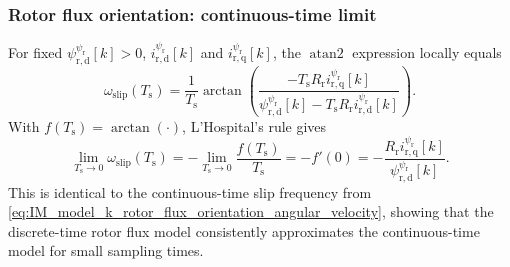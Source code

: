 \begin{frame}
    \frametitle{Rotor flux orientation: continuous-time limit}
    For fixed \(\psi^{\psi_\mathrm{r}}_{\mathrm{r,d}}[k]>0\), \(i^{\psi_\mathrm{r}}_{\mathrm{r,d}}[k]\) and \(i^{\psi_\mathrm{r}}_{\mathrm{r,q}}[k]\), the \(\operatorname{atan2}\) expression locally equals
    \begin{equation}
        \omega_\mathrm{slip}(T_\mathrm{s})=\frac{1}{T_\mathrm{s}}
        \arctan\!\left(
        \frac{-T_\mathrm{s}R_\mathrm{r}i^{\psi_\mathrm{r}}_{\mathrm{r,q}}[k]}
        {\psi^{\psi_\mathrm{r}}_{\mathrm{r,d}}[k]-T_\mathrm{s}R_\mathrm{r}i^{\psi_\mathrm{r}}_{\mathrm{r,d}}[k]}
        \right).
        \label{eq:IM_dt_RFO_slip_limit_start}
    \end{equation}\pause%
    With \(f(T_\mathrm{s})=\arctan(\cdot)\), L'Hospital's rule gives
    \begin{equation}
        \lim_{T_\mathrm{s}\rightarrow 0}\omega_\mathrm{slip}(T_\mathrm{s})
        =-\lim_{T_\mathrm{s}\rightarrow 0}\frac{f(T_\mathrm{s})}{T_\mathrm{s}}
        =-f'(0)=-\frac{R_\mathrm{r}i^{\psi_\mathrm{r}}_{\mathrm{r,q}}[k]}
        {\psi^{\psi_\mathrm{r}}_{\mathrm{r,d}}[k]}.
        \label{eq:IM_dt_RFO_slip_limit_rotor_current}
    \end{equation}\pause%
    This is identical to the continuous-time slip frequency from \eqref{eq:IM_model_k_rotor_flux_orientation_angular_velocity}, showing that the discrete-time rotor flux model consistently approximates the continuous-time model for small sampling times.
\end{frame}

